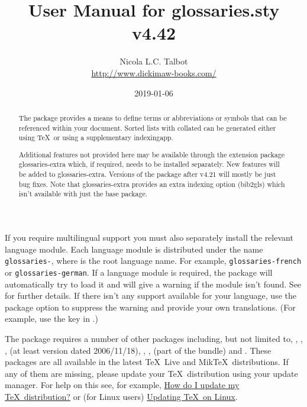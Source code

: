 \documentclass[report,inlinetitle,widecs]{nlctdoc}
\newcounter{option}
\newcommand*{\gloskey}[2][newglossaryentry]{\csopt{#1}{#2}}
\begin{document}
\DeleteShortVerb{\|}

 \title{User Manual for glossaries.sty v4.42}
 \author{Nicola L.C. Talbot\\%
  \url{http://www.dickimaw-books.com/}}

 \date{2019-01-06}
 \maketitle

\begin{abstract}
The  package provides a means to define terms or
abbreviations or symbols that can be referenced within your document.
Sorted lists with collated  can be 
generated either using \TeX\ or using a supplementary \gls{indexingapp}.

Additional features not provided here may be available through
the extension package \gls{glossaries-extra} which, if required,
needs to be installed separately. New features will be added to
\gls*{glossaries-extra}. Versions of the 
package after v4.21 will mostly be just bug fixes. Note that 
\gls{glossaries-extra} provides an extra indexing option
(\gls{bib2gls}) which isn't available with just the base
 package.
\end{abstract}

If you require multilingual support you must also separately install 
the relevant language module. Each language module is distributed
under the name \texttt{glossaries-}, where  is the
root language name. For example, \texttt{glossaries-french}
or \texttt{glossaries-german}. If a language module is required,
the  package will automatically try to load it and
will give a warning if the module isn't found. See
 for further details.
If there isn't any support available for your language, use
the  package option to suppress the warning
and provide your own translations. (For example, use
the \gloskey[printglossary]{title} key in .)

The  package requires a number of other packages
including, but not limited to, , ,
,
 (at least version dated 2006/11/18), ,
,  (part of the  bundle) and . These
packages are all available in the latest \TeX~Live and Mik\TeX\
distributions. If any of them are missing, please update your
\TeX\ distribution using your update manager.
For help on this see, for example,
\href{http://tex.stackexchange.com/questions/55437/how-do-i-update-my-tex-distribution}{How
do I update my \TeX\ distribution?}
or (for Linux users)
\href{http://tex.stackexchange.com/questions/14925/updating-tex-on-linux}{Updating
\TeX\ on Linux}.
\end{document}
